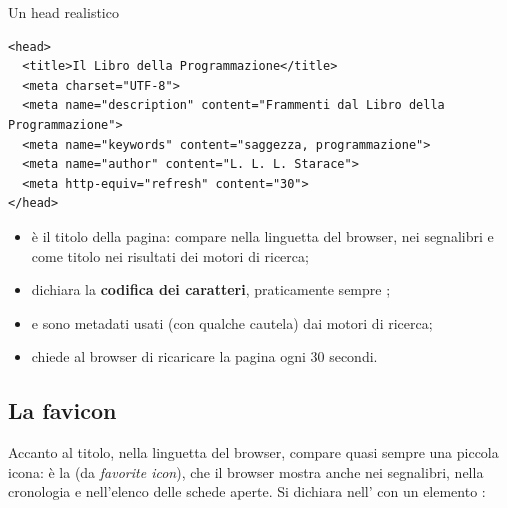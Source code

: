 \begin{esempio}{Un head realistico}
\begin{lstlisting}[style=html, name=head.html]
<head>
  <title>Il Libro della Programmazione</title>
  <meta charset="UTF-8">
  <meta name="description" content="Frammenti dal Libro della Programmazione">
  <meta name="keywords" content="saggezza, programmazione">
  <meta name="author" content="L. L. L. Starace">
  <meta http-equiv="refresh" content="30">
</head>
\end{lstlisting}

\begin{itemize}
  \item {} è il titolo della pagina: compare nella linguetta del browser,
        nei segnalibri e come titolo nei risultati dei motori di ricerca;
  \item {} dichiara la \textbf{codifica dei caratteri}, praticamente
        sempre ;
  \item {} e  sono metadati usati (con qualche
        cautela) dai motori di ricerca;
  \item {} chiede al browser di ricaricare la pagina
        ogni 30 secondi.
\end{itemize}
\end{esempio}


\subsection{La favicon}

Accanto al titolo, nella linguetta del browser, compare quasi sempre una piccola
icona: è la  (da \textit{favorite icon}), che il browser mostra
anche nei segnalibri, nella cronologia e nell'elenco delle schede aperte. Si
dichiara nell' con un elemento :

